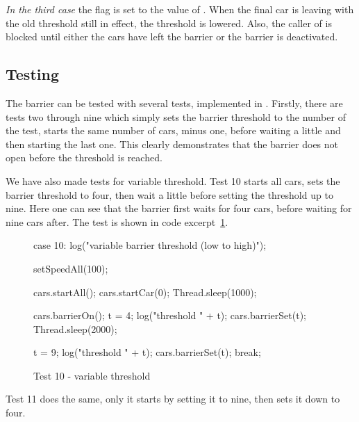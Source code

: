 \emph{In the third case} the flag  is set to
the value of . When the final car is leaving with the old
threshold still in effect, the threshold is lowered. Also, the caller
of  is blocked until either the cars have left the
barrier or the barrier is deactivated.


\subsection{Testing}
\label{sub:bar-test}
The barrier can be tested with several tests, implemented in
. Firstly, there are tests two through nine which simply
sets the barrier threshold to the number of the test, starts the same number of cars, minus
one, before waiting a little and then starting the last one. This
clearly demonstrates that the barrier does not open before the threshold is reached.

We have also made tests for variable threshold. Test 10 starts all
cars, sets the barrier threshold to four, then wait a little before
setting the threshold up to nine. Here one can see that the barrier first
waits for four cars, before waiting for nine cars after. The test is
shown in code excerpt~\ref{lst:bar-test}.

\begin{figure}[H]
\begin{java}
case 10:
    log("variable barrier threshold (low to high)");

    setSpeedAll(100);

    cars.startAll();
    cars.startCar(0);
    Thread.sleep(1000);

    cars.barrierOn();
    t = 4;
    log("threshold " + t);
    cars.barrierSet(t);
    Thread.sleep(2000);

    t = 9;
    log("threshold " + t);
    cars.barrierSet(t);
    break;
\end{java}
\caption{Test 10 - variable threshold}
\label{lst:bar-test}
\end{figure}

Test 11 does the same, only it starts by setting it to nine, then sets
it down to four.